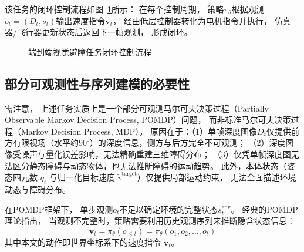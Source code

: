 该任务的闭环控制流程如图~\ref{fig:task_loop}所示：
在每个控制周期，
策略$\pi_\theta$根据观测$o_t = (D_t, s_t)$输出速度指令$\mathbf{v}_t$，
经由低层控制器转化为电机指令并执行，
仿真器/飞行器更新状态后返回下一帧观测，
形成闭环。

\begin{figure}[htbp]
\centering
{}
\caption{端到端视觉避障任务闭环控制流程}
\label{fig:task_loop}
\end{figure}

\subsection{部分可观测性与序列建模的必要性}

需注意，
上述任务实质上是一个部分可观测马尔可夫决策过程（Partially Observable Markov Decision Process, POMDP）问题，
而非标准马尔可夫决策过程（Markov Decision Process, MDP）。
原因在于：（1）单帧深度图像$D_t$仅提供前方有限视场（水平约$90^\circ$）的深度信息，侧方与后方完全不可观测；
（2）深度图像受噪声与量化误差影响，无法精确重建三维障碍分布；
（3）仅凭单帧深度图无法区分静态障碍与动态物体，也无法推断障碍的运动趋势。
此外，本体状态（姿态四元数 $q_t$ 与归一化目标速度 $\tilde{v}^{\text{target}}$）仅提供局部运动约束，
无法全面描述环境动态与障碍分布。

在POMDP框架下，
单步观测$o_t$不足以确定环境的完整状态$s_t^{\text{env}}$。
经典的POMDP理论\cite{Kaelbling1998POMDP}指出，
当观测不完整时，策略需要利用历史观测序列来推断隐含状态信息：
\begin{equation}
  \mathbf{v}_t = \pi_\theta(o_{\le t}) = \pi_\theta(o_1, o_2, \ldots, o_t)
\end{equation}
其中本文的动作即世界坐标系下的速度指令 $\mathbf{v}_t$。

